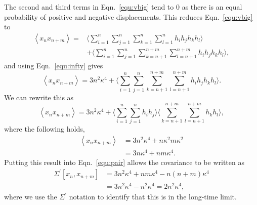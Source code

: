 \documentclass[reprint,superscriptaddress,nobibnotes,amsmath,amssymb,aps,prx,hidelinks]{revtex4-2}
\newcommand{\oMSDn}{\ensuremath{x_n}}
\newcommand{\oMSDm}{\ensuremath{x_{n + m}}}
\begin{document}
%
The second and third terms in Eqn.~\ref{equ:vbig} tend to \num{0} as there is an equal probability of positive and negative displacements. 
This reduces Eqn.~\ref{equ:vbig} to 
%
\begin{equation}
    \begin{aligned}
        \left<\oMSDn\oMSDm\right> = & \Bigg\langle \sum_{i=1}^n\sum_{j=1}^n\sum_{k=1}^{n}\sum_{l=1}^{n} h_i h_j h_k h_l \Bigg\rangle \\
        & + \Bigg\langle \sum_{i=1}^n\sum_{j=1}^n\sum_{k=n+1}^{n+m}\sum_{l=n+1}^{n+m} h_i h_j h_k h_l \Bigg\rangle, 
    \end{aligned}
\end{equation}
%
and using Eqn.~\ref{equ:infty} gives
%
\begin{equation}
    \left<\oMSDn\oMSDm\right> = 3n^2\kappa^4 + \Bigg\langle \sum_{i=1}^n\sum_{j=1}^n\sum_{k=n+1}^{n+m}\sum_{l=n+1}^{n+m} h_i h_j h_k h_l \Bigg\rangle.
\end{equation}
%
We can rewrite this as
%
\begin{equation}
    \left<\oMSDn\oMSDm\right> = 3n^2\kappa^4 + \Bigg\langle \sum_{i=1}^n\sum_{j=1}^n h_i h_j \Bigg\rangle \Bigg\langle \sum_{k=n+1}^{n+m}\sum_{l=n+1}^{n+m} h_k h_l \Bigg\rangle,
\end{equation}
%
where the following holds,
%
\begin{equation}
    \begin{aligned}
        \left<\oMSDn\oMSDm\right> &= 3n^2\kappa^4 + n\kappa^2 m\kappa^2 \\
                                  &= 3n\kappa^4 + nm\kappa^4.
    \end{aligned}
\end{equation}
%
Putting this result into Eqn.~\ref{equ:pair} allows the covariance to be written as
%
\begin{equation}
    \begin{aligned}
    \Sigma^\prime \left[\oMSDn, \oMSDm \right] &= 3n^2\kappa^4 + nm\kappa^4 - n(n+m)\kappa^4 \\
                                        &= 3n^2\kappa^4 - n^2\kappa^4 = 2n^2\kappa^4,
    \end{aligned}
    \label{equ:cov_der}
\end{equation}
where we use the $\Sigma^\prime$ notation to identify that this is in the long-time limit. 
\end{document}
